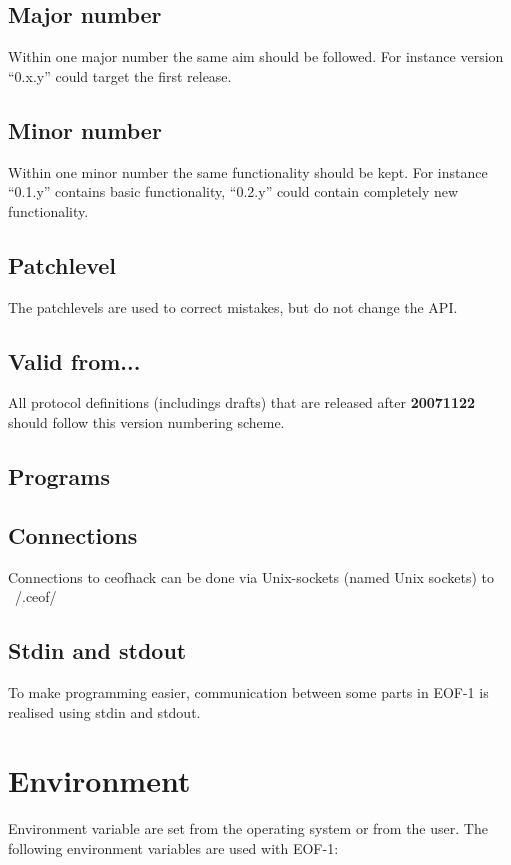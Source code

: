 \documentclass[12pt,a4paper]{book}
\begin{document}
\subsection{Major number}
Within one major number the same aim should be followed. For instance
version "`0.x.y"' could target the first release.
\subsection{Minor number}
Within one minor number the same functionality should be kept.
For instance "`0.1.y"' contains basic functionality, "`0.2.y"' could
contain completely new functionality.
\subsection{Patchlevel}
The patchlevels are used to correct mistakes, but do not change the API.
\subsection{Valid from...}
All protocol definitions (includings drafts) that are released after
\textbf{20071122} should follow this version numbering scheme.
\subsection{Programs}
\subsection{Connections}
Connections to ceofhack can be done via Unix-sockets (named Unix sockets) to
~/.ceof/
\subsection{Stdin  and stdout}
To make programming easier, communication between some parts in EOF-1 is realised
using stdin and stdout. 
\section{Environment}
Environment variable are set from the operating system or from the user.
The following environment variables are used with EOF-1:
\end{document}
